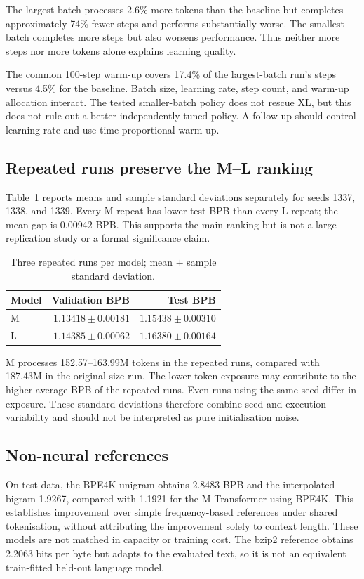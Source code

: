 \documentclass[11pt]{article}
\begin{document}
The largest batch processes 2.6\% more tokens than the baseline but completes approximately 74\% fewer steps and performs substantially worse. The smallest batch completes more steps but also worsens performance. Thus neither more steps nor more tokens alone explains learning quality.

The common 100-step warm-up covers 17.4\% of the largest-batch run's steps versus 4.5\% for the baseline. Batch size, learning rate, step count, and warm-up allocation interact. The tested smaller-batch policy does not rescue XL, but this does not rule out a better independently tuned policy. A follow-up should control learning rate and use time-proportional warm-up.

\subsection{Repeated runs preserve the M--L ranking}\label{sec:repeats}
Table~\ref{tab:seeds} reports means and sample standard deviations separately for seeds 1337, 1338, and 1339. Every M repeat has lower test BPB than every L repeat; the mean gap is 0.00942 BPB. This supports the main ranking but is not a large replication study or a formal significance claim.

\begin{table}[htbp]
\centering\small
\caption{Three repeated runs per model; mean $\pm$ sample standard deviation.}
\label{tab:seeds}
\begin{tabular}{lrr}
\toprule
Model & Validation BPB & Test BPB\\
\midrule
M & $1.13418\pm0.00181$ & $1.15438\pm0.00310$\\
L & $1.14385\pm0.00062$ & $1.16380\pm0.00164$\\
\bottomrule
\end{tabular}
\end{table}

M processes 152.57--163.99M tokens in the repeated runs, compared with 187.43M in the original size run. The lower token exposure may contribute to the higher average BPB of the repeated runs. Even runs using the same seed differ in exposure. These standard deviations therefore combine seed and execution variability and should not be interpreted as pure initialisation noise.

\subsection{Non-neural references}
On test data, the BPE4K unigram obtains 2.8483 BPB and the interpolated bigram 1.9267, compared with 1.1921 for the M Transformer using BPE4K. This establishes improvement over simple frequency-based references under shared tokenisation, without attributing the improvement solely to context length. These models are not matched in capacity or training cost. The bzip2 reference obtains 2.2063 bits per byte but adapts to the evaluated text, so it is not an equivalent train-fitted held-out language model.
\end{document}
